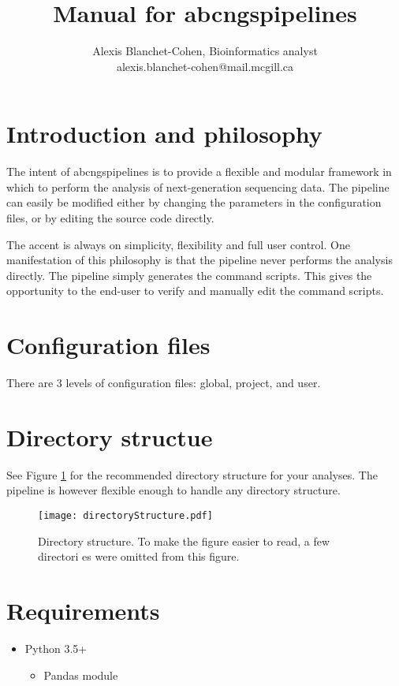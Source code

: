 \documentclass[12pt]{article}
\title{ Manual for abcngspipelines }
\author{ Alexis Blanchet-Cohen, Bioinformatics analyst \\ alexis.blanchet-cohen@mail.mcgill.ca}
\begin{document}
\maketitle
\thispagestyle{empty} %

\newpage
\tableofcontents
\newpage

\section{Introduction and philosophy}

The intent of abcngspipelines is to provide a flexible and modular framework in which to perform the analysis of next-generation sequencing data.
The pipeline can easily be modified either by changing the parameters in the configuration files, or by editing the source code directly.

The accent is always on simplicity, flexibility and full user control.
One manifestation of this philosophy is that the pipeline never performs the analysis directly. The pipeline simply generates the command scripts. This gives the opportunity to the end-user to verify and manually edit the command scripts.

\section{Configuration files}
There are 3 levels of configuration files: global, project, and user.

\section{Directory structue}
See Figure \ref{figure:directorystructure} for the recommended directory structure for your analyses.
The pipeline is however flexible enough to handle any directory structure.

\begin{figure}[htb]
\centering
\texttt{[image: directoryStructure.pdf]}
\caption{Directory structure. To make the figure easier to read, a few directori
es were omitted from this figure.}
\label{figure:directorystructure}
\end{figure}

\section{Requirements}
\begin{itemize}
    \item{Python 3.5+}
    \begin{itemize}
	\item{Pandas module}
    \end{itemize}
\end{itemize}

\clearpage


\end{document}
